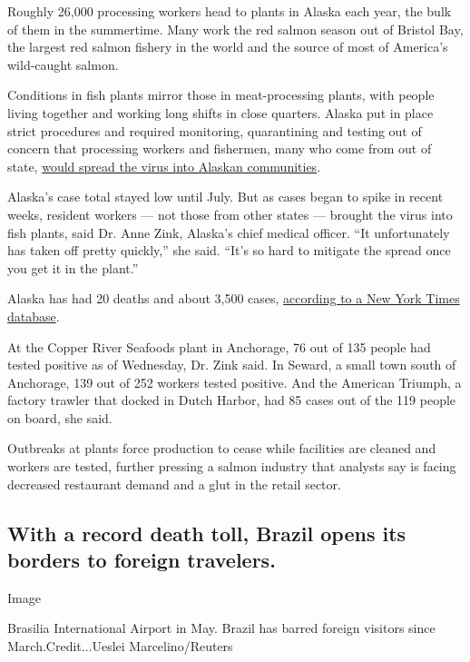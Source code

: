 Roughly 26,000 processing workers head to plants in Alaska each year,
the bulk of them in the summertime. Many work the red salmon season out
of Bristol Bay, the largest red salmon fishery in the world and the
source of most of America's wild-caught salmon.

Conditions in fish plants mirror those in meat-processing plants, with
people living together and working long shifts in close quarters. Alaska
put in place strict procedures and required monitoring, quarantining and
testing out of concern that processing workers and fishermen, many who
come from out of state,
\href{https://www.nytimes3xbfgragh.onion/2020/05/14/us/coronavirus-alaska-fishing-copper-river.html}{would
spread the virus into Alaskan communities}.

Alaska's case total stayed low until July. But as cases began to spike
in recent weeks, resident workers --- not those from other states ---
brought the virus into fish plants, said Dr. Anne Zink, Alaska's chief
medical officer. ``It unfortunately has taken off pretty quickly,'' she
said. ``It's so hard to mitigate the spread once you get it in the
plant.''

Alaska has had 20 deaths and about 3,500 cases,
\href{https://www.nytimes3xbfgragh.onion/interactive/2020/us/alaska-coronavirus-cases.html}{according
to a New York Times database}.

At the Copper River Seafoods plant in Anchorage, 76 out of 135 people
had tested positive as of Wednesday, Dr. Zink said. In Seward, a small
town south of Anchorage, 139 out of 252 workers tested positive. And the
American Triumph, a factory trawler that docked in Dutch Harbor, had 85
cases out of the 119 people on board, she said.

Outbreaks at plants force production to cease while facilities are
cleaned and workers are tested, further pressing a salmon industry that
analysts say is facing decreased restaurant demand and a glut in the
retail sector.

\hypertarget{with-a-record-death-toll-brazil-opens-its-borders-to-foreign-travelers}{%
\subsection{With a record death toll, Brazil opens its borders to
foreign
travelers.}\label{with-a-record-death-toll-brazil-opens-its-borders-to-foreign-travelers}}

Image

Brasilia International Airport in May. Brazil has barred foreign
visitors since March.Credit...Ueslei Marcelino/Reuters

